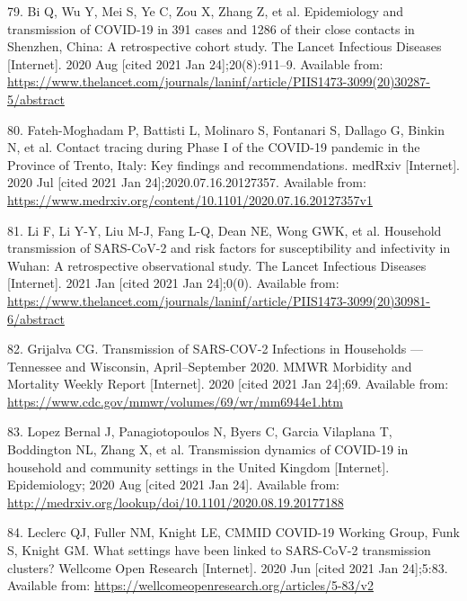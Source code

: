 \documentclass[
]{article}
\begin{document}
\leavevmode\hypertarget{ref-bi_epidemiology_2020}{}%
79. Bi Q, Wu Y, Mei S, Ye C, Zou X, Zhang Z, et al. Epidemiology and
transmission of COVID-19 in 391 cases and 1286 of their close contacts
in Shenzhen, China: A retrospective cohort study. The Lancet Infectious
Diseases {[}Internet{]}. 2020 Aug {[}cited 2021 Jan 24{]};20(8):911--9.
Available from:
\url{https://www.thelancet.com/journals/laninf/article/PIIS1473-3099(20)30287-5/abstract}

\leavevmode\hypertarget{ref-fateh-moghadam_contact_2020}{}%
80. Fateh-Moghadam P, Battisti L, Molinaro S, Fontanari S, Dallago G,
Binkin N, et al. Contact tracing during Phase I of the COVID-19 pandemic
in the Province of Trento, Italy: Key findings and recommendations.
medRxiv {[}Internet{]}. 2020 Jul {[}cited 2021 Jan
24{]};2020.07.16.20127357. Available from:
\url{https://www.medrxiv.org/content/10.1101/2020.07.16.20127357v1}

\leavevmode\hypertarget{ref-li_household_2021}{}%
81. Li F, Li Y-Y, Liu M-J, Fang L-Q, Dean NE, Wong GWK, et al. Household
transmission of SARS-CoV-2 and risk factors for susceptibility and
infectivity in Wuhan: A retrospective observational study. The Lancet
Infectious Diseases {[}Internet{]}. 2021 Jan {[}cited 2021 Jan
24{]};0(0). Available from:
\url{https://www.thelancet.com/journals/laninf/article/PIIS1473-3099(20)30981-6/abstract}

\leavevmode\hypertarget{ref-grijalva_transmission_2020}{}%
82. Grijalva CG. Transmission of SARS-COV-2 Infections in Households ---
Tennessee and Wisconsin, April--September 2020. MMWR Morbidity and
Mortality Weekly Report {[}Internet{]}. 2020 {[}cited 2021 Jan 24{]};69.
Available from:
\url{https://www.cdc.gov/mmwr/volumes/69/wr/mm6944e1.htm}

\leavevmode\hypertarget{ref-lopez_bernal_transmission_2020}{}%
83. Lopez Bernal J, Panagiotopoulos N, Byers C, Garcia Vilaplana T,
Boddington NL, Zhang X, et al. Transmission dynamics of COVID-19 in
household and community settings in the United Kingdom {[}Internet{]}.
Epidemiology; 2020 Aug {[}cited 2021 Jan 24{]}. Available from:
\url{http://medrxiv.org/lookup/doi/10.1101/2020.08.19.20177188}

\leavevmode\hypertarget{ref-leclerc_what_2020}{}%
84. Leclerc QJ, Fuller NM, Knight LE, CMMID COVID-19 Working Group, Funk
S, Knight GM. What settings have been linked to SARS-CoV-2 transmission
clusters? Wellcome Open Research {[}Internet{]}. 2020 Jun {[}cited 2021
Jan 24{]};5:83. Available from:
\url{https://wellcomeopenresearch.org/articles/5-83/v2}
\end{document}
